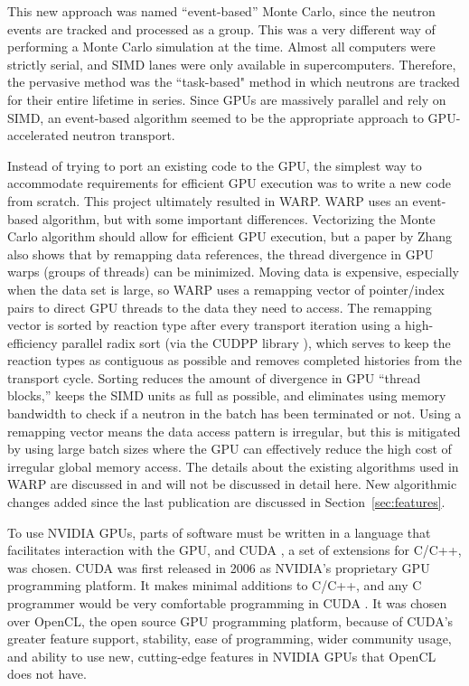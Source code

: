 \documentclass[preprint,12pt]{elsarticle}
\begin{document}
This new approach was named ``event-based'' Monte Carlo, since the neutron events are tracked and processed as a group.  This was a very different way of performing a Monte Carlo simulation at the time.  Almost all computers were strictly serial, and SIMD lanes were only available in supercomputers.  Therefore, the pervasive method was the ``task-based" method in which neutrons are tracked for their entire lifetime in series.  Since GPUs are massively parallel and rely on SIMD, an event-based algorithm seemed to be the appropriate approach to GPU-accelerated neutron transport.  

Instead of trying to port an existing code to the GPU, the simplest way to accommodate requirements for efficient GPU execution was to write a new code from scratch.  This project ultimately resulted in WARP.  WARP uses an event-based algorithm, but with some important differences.  Vectorizing the Monte Carlo algorithm should allow for efficient GPU execution, but a paper by Zhang \cite{on_the_fly_remapping} also shows that by remapping data references, the thread divergence in GPU warps (groups of threads) can be minimized. Moving data is expensive, especially when the data set is large, so WARP uses a remapping vector of pointer/index pairs to direct GPU threads to the data they need to access.  The remapping vector is sorted  by reaction type after every transport iteration using a high-efficiency parallel radix sort (via the CUDPP library \cite{CUDPP}), which serves to keep the reaction types as contiguous as possible and removes completed histories from the transport cycle.  Sorting reduces the amount of divergence in GPU ``thread blocks,'' keeps the SIMD units as full as possible, and eliminates using memory bandwidth to check if a neutron in the batch has been terminated or not.  Using a remapping vector means the data access pattern is irregular, but this is mitigated by using large batch sizes where the GPU can effectively reduce the high cost of irregular global memory access.  The details about the existing algorithms used in WARP are discussed in \cite{algorithms} and will not be discussed in detail here.  New algorithmic changes added since the last publication are discussed in Section~\ref{sec:features}.

To use NVIDIA GPUs, parts of software must be written in a language that facilitates interaction with the GPU, and CUDA \cite{cuda}, a set of extensions for C/C++, was chosen.  CUDA was first released in 2006 as NVIDIA's proprietary GPU programming platform.  It makes minimal additions to C/C++, and any C programmer would be very comfortable programming in CUDA \cite{cuda}.  It was chosen over OpenCL, the open source GPU programming platform, because of CUDA's greater feature support, stability, ease of programming, wider community usage, and ability to use new, cutting-edge features in NVIDIA GPUs that OpenCL does not have.
\end{document}
